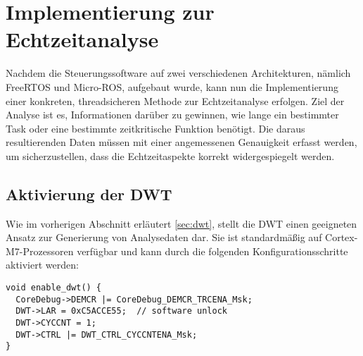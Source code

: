 \section{Implementierung zur Echtzeitanalyse}

Nachdem die Steuerungssoftware auf zwei verschiedenen Architekturen, nämlich
FreeRTOS und Micro-ROS, aufgebaut wurde, kann nun die Implementierung einer
konkreten, threadsicheren Methode zur Echtzeitanalyse erfolgen. Ziel der Analyse
ist es, Informationen darüber zu gewinnen, wie lange ein bestimmter Task oder
eine bestimmte zeitkritische Funktion benötigt. Die daraus resultierenden Daten
müssen mit einer angemessenen Genauigkeit erfasst werden, um sicherzustellen,
dass die Echtzeitaspekte korrekt widergespiegelt werden.


\subsection{Aktivierung der DWT}

Wie im vorherigen Abschnitt erläutert \ref{sec:dwt}, stellt die DWT einen
geeigneten Ansatz zur Generierung von Analysedaten dar. Sie ist standardmäßig
auf Cortex-M7-Prozessoren verfügbar und kann durch die folgenden
Konfigurationsschritte aktiviert werden:

\begin{code}
\begin{verbatim}
void enable_dwt() {
  CoreDebug->DEMCR |= CoreDebug_DEMCR_TRCENA_Msk;
  DWT->LAR = 0xC5ACCE55;  // software unlock
  DWT->CYCCNT = 1;
  DWT->CTRL |= DWT_CTRL_CYCCNTENA_Msk;
}
\end{verbatim}
\end{code}
